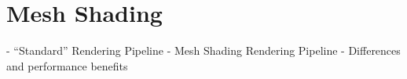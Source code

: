 \chapter{Mesh Shading}






- “Standard” Rendering Pipeline
- Mesh Shading Rendering Pipeline
- Differences and performance benefits
